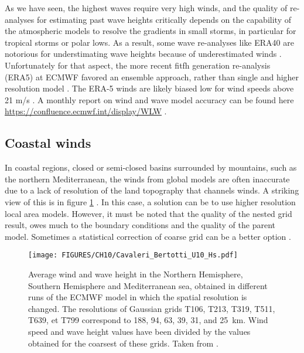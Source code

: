 As we have seen, the highest waves require very high winds, and the quality of re-analyses for estimating past wave heights critically depends 
on the capability of the atmospheric models to resolve the gradients in small storms, in particular for tropical storms or polar lows. As a result, some wave re-analyses like ERA40 are notorious for understimating 
wave heights because of underestimated winds \citep{Caires&Sterl2005}. Unfortunately for that aspect, the more recent fitfh generation re-analysis (ERA5) at ECMWF 
favored an ensemble approach, rather than single and higher resolution model \citep{Hersbach&al.2020}. The ERA-5 winds are likely biased low for wind speeds above 21 m/s \citep{Pineau-Guillou&al.2018}. A monthly report on wind and wave model accuracy can be found here \url{https://confluence.ecmwf.int/display/WLW} .
 

\subsection{Coastal winds}
In coastal regions, closed or semi-closed basins surrounded by mountains, such as the northern Mediterranean, the winds 
from global models are often inaccurate due to a lack of resolution of the land topography that channels winds. 
A striking view of this is in figure 
\ref{wind_Cavaleri} \citep{Cavaleri&Bertotti2006}. In this case, a solution can be to use higher resolution local area models. 
However, it must be noted that the quality of the nested grid result, owes much to the boundary conditions and 
the quality of the parent model. Sometimes a statistical correction of coarse grid can be a better option \citep{Signell&al.2005}.
\begin{figure}
\centerline{\texttt{[image: FIGURES/CH10/Cavaleri\_Bertotti\_U10\_Hs.pdf]}}
\caption{Average wind and wave height in the Northern Hemisphere, Southern Hemisphere and Mediterranean sea, 
obtained in different runs of the ECMWF model in which the spatial resolution is changed. The resolutions of Gaussian grids 
T106, T213, T319, T511, T639, et T799 correspond to 
188, 94, 63, 39, 31, and 25~km. Wind speed and wave height values have been divided by the values obtained for the coarsest 
of these grids. Taken from \cite[][\copyright Elsevier]{Cavaleri&Bertotti2006}.}
\label{wind_Cavaleri}
\end{figure}

